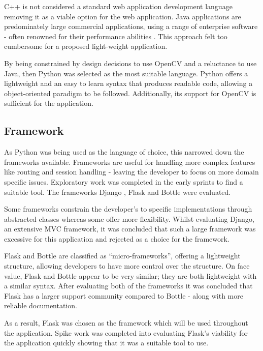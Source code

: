 C++ is not considered a standard web application development language removing it as a viable option for the web application. Java applications are predominately large commercial applications, using a range of enterprise software - often renowned for their performance abilities \cite{citeulike:14019744}. This approach felt too cumbersome for a proposed light-weight application.

By being constrained by design decisions to use OpenCV and a reluctance to use Java, then Python was selected as the most suitable language. Python offers a lightweight and an easy to learn syntax that produces readable code, allowing a object-oriented paradigm to be followed. Additionally, its support for OpenCV is sufficient for the application.

\subsection{Framework} \label{language:framework}
As Python was being used as the language of choice, this narrowed down the frameworks available. Frameworks are useful for handling more complex features like routing and session handling - leaving the developer to focus on more domain specific issues.   Exploratory work was completed in the early sprints to find a suitable tool. The frameworks Django \cite{citeulike:14019784}, Flask \cite{citeulike:13160396} and Bottle \cite{citeulike:14019792} were evaluated.

Some frameworks constrain the developer's to specific implementations through abstracted classes whereas some offer more flexibility. Whilst evaluating Django, an extensive MVC framework, it was concluded that such a large framework was excessive for this application and rejected as a choice for the framework.

Flask and Bottle are classified as ``micro-frameworks'', offering a lightweight structure, allowing developers to have more control over the structure. On face value, Flask and Bottle appear to be very similar; they are both lightweight with a similar syntax. After evaluating both of the frameworks it was concluded that Flask has a larger support community compared to Bottle - along with more reliable documentation.

As a result, Flask was chosen as the framework which will be used throughout the application. Spike work was completed into evaluating Flask's viability for the application quickly showing that it was a suitable tool to use.

